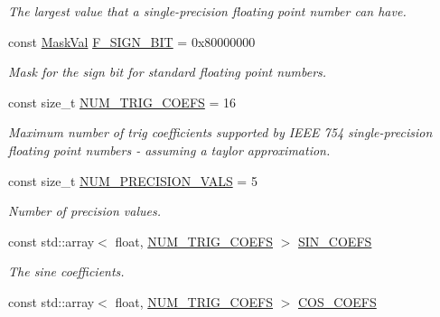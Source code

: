\begin{DoxyCompactItemize}
\begin{DoxyCompactList}\small\item\em The largest value that a single-\/precision floating point number can have. \end{DoxyCompactList}\item 
const \hyperlink{group___scalar_math_consts_gad991473bd51363f9743013730e68751a}{Mask\+Val} \hyperlink{group___scalar_math_consts_gad2489c06f986e5af29bfb5c2eaca185f}{F\+\_\+\+S\+I\+G\+N\+\_\+\+B\+I\+T} = 0x80000000
\begin{DoxyCompactList}\small\item\em Mask for the sign bit for standard floating point numbers. \end{DoxyCompactList}\item 
const size\+\_\+t \hyperlink{group___scalar_math_consts_ga090f5a34fbed01148a6f72dc1abb00e9}{N\+U\+M\+\_\+\+T\+R\+I\+G\+\_\+\+C\+O\+E\+F\+S} = 16
\begin{DoxyCompactList}\small\item\em Maximum number of trig coefficients supported by I\+E\+E\+E 754 single-\/precision floating point numbers -\/ assuming a taylor approximation. \end{DoxyCompactList}\item 
\hypertarget{group___scalar_math_consts_ga2b78b41d32d14485b997dada705037bb}{}const size\+\_\+t \hyperlink{group___scalar_math_consts_ga2b78b41d32d14485b997dada705037bb}{N\+U\+M\+\_\+\+P\+R\+E\+C\+I\+S\+I\+O\+N\+\_\+\+V\+A\+L\+S} = 5\label{group___scalar_math_consts_ga2b78b41d32d14485b997dada705037bb}

\begin{DoxyCompactList}\small\item\em Number of precision values. \end{DoxyCompactList}\item 
\hypertarget{group___scalar_math_consts_gaf9ed3a0307a3da747c8515d9719f28eb}{}const std\+::array$<$ float, \hyperlink{group___scalar_math_consts_ga090f5a34fbed01148a6f72dc1abb00e9}{N\+U\+M\+\_\+\+T\+R\+I\+G\+\_\+\+C\+O\+E\+F\+S} $>$ \hyperlink{group___scalar_math_consts_gaf9ed3a0307a3da747c8515d9719f28eb}{S\+I\+N\+\_\+\+C\+O\+E\+F\+S}\label{group___scalar_math_consts_gaf9ed3a0307a3da747c8515d9719f28eb}

\begin{DoxyCompactList}\small\item\em The sine coefficients. \end{DoxyCompactList}\item 
\hypertarget{group___scalar_math_consts_ga3cff608c650433d8c7a42212ba6296aa}{}const std\+::array$<$ float, \hyperlink{group___scalar_math_consts_ga090f5a34fbed01148a6f72dc1abb00e9}{N\+U\+M\+\_\+\+T\+R\+I\+G\+\_\+\+C\+O\+E\+F\+S} $>$ \hyperlink{group___scalar_math_consts_ga3cff608c650433d8c7a42212ba6296aa}{C\+O\+S\+\_\+\+C\+O\+E\+F\+S}\label{group___scalar_math_consts_ga3cff608c650433d8c7a42212ba6296aa}


\end{DoxyCompactItemize}
